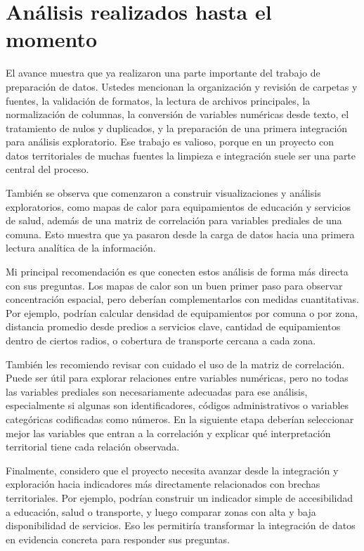 \documentclass[11pt]{article}
\begin{document}
\section{Análisis realizados hasta el momento}

El avance muestra que ya realizaron una parte importante del trabajo de preparación de datos. Ustedes mencionan la organización y revisión de carpetas y fuentes, la validación de formatos, la lectura de archivos principales, la normalización de columnas, la conversión de variables numéricas desde texto, el tratamiento de nulos y duplicados, y la preparación de una primera integración para análisis exploratorio. Ese trabajo es valioso, porque en un proyecto con datos territoriales de muchas fuentes la limpieza e integración suele ser una parte central del proceso.

También se observa que comenzaron a construir visualizaciones y análisis exploratorios, como mapas de calor para equipamientos de educación y servicios de salud, además de una matriz de correlación para variables prediales de una comuna. Esto muestra que ya pasaron desde la carga de datos hacia una primera lectura analítica de la información.

Mi principal recomendación es que conecten estos análisis de forma más directa con sus preguntas. Los mapas de calor son un buen primer paso para observar concentración espacial, pero deberían complementarlos con medidas cuantitativas. Por ejemplo, podrían calcular densidad de equipamientos por comuna o por zona, distancia promedio desde predios a servicios clave, cantidad de equipamientos dentro de ciertos radios, o cobertura de transporte cercana a cada zona.

También les recomiendo revisar con cuidado el uso de la matriz de correlación. Puede ser útil para explorar relaciones entre variables numéricas, pero no todas las variables prediales son necesariamente adecuadas para ese análisis, especialmente si algunas son identificadores, códigos administrativos o variables categóricas codificadas como números. En la siguiente etapa deberían seleccionar mejor las variables que entran a la correlación y explicar qué interpretación territorial tiene cada relación observada.

Finalmente, considero que el proyecto necesita avanzar desde la integración y exploración hacia indicadores más directamente relacionados con brechas territoriales. Por ejemplo, podrían construir un indicador simple de accesibilidad a educación, salud o transporte, y luego comparar zonas con alta y baja disponibilidad de servicios. Eso les permitiría transformar la integración de datos en evidencia concreta para responder sus preguntas.
\end{document}
